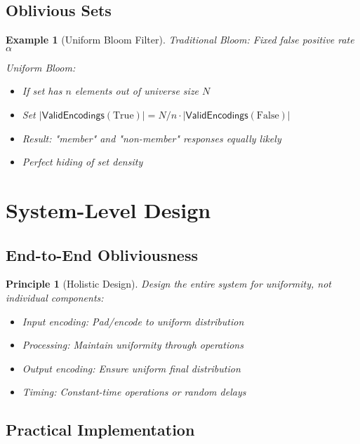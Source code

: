 \documentclass[11pt,final,hidelinks]{article}
\newcommand{\ValidEnc}[1]{\mathsf{ValidEncodings}(#1)}
\newtheorem{example}[theorem]{Example}
\newtheorem{principle}[theorem]{Principle}
\begin{document}
\subsection{Oblivious Sets}

\begin{example}[Uniform Bloom Filter]
Traditional Bloom: Fixed false positive rate $\alpha$

Uniform Bloom:
\begin{itemize}
    \item If set has $n$ elements out of universe size $N$
    \item Set $|\ValidEnc{\text{True}}| = N/n \cdot |\ValidEnc{\text{False}}|$
    \item Result: "member" and "non-member" responses equally likely
    \item Perfect hiding of set density
\end{itemize}
\end{example}

\section{System-Level Design}

\subsection{End-to-End Obliviousness}

\begin{principle}[Holistic Design]
Design the entire system for uniformity, not individual components:
\begin{itemize}
    \item Input encoding: Pad/encode to uniform distribution
    \item Processing: Maintain uniformity through operations
    \item Output encoding: Ensure uniform final distribution
    \item Timing: Constant-time operations or random delays
\end{itemize}
\end{principle}

\subsection{Practical Implementation}
\end{document}
